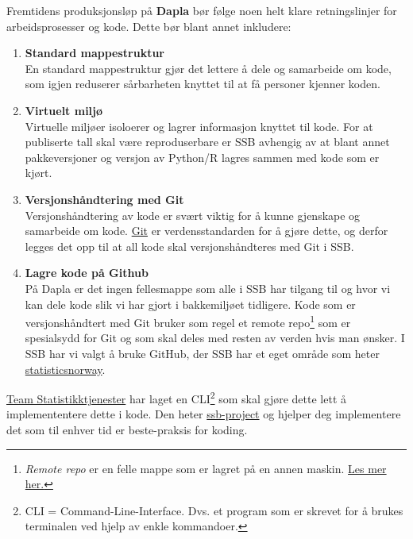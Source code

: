 \documentclass[
  letterpaper,
  DIV=11,
  numbers=noendperiod]{scrreprt}
\providecommand{\tightlist}{%
  \setlength{\itemsep}{0pt}\setlength{\parskip}{0pt}}\usepackage{longtable,booktabs,array}
\begin{document}
Fremtidens produksjonsløp på \textbf{Dapla} bør følge noen helt klare
retningslinjer for arbeidsprosesser og kode. Dette bør blant annet
inkludere:

\begin{enumerate}
\def\labelenumi{\arabic{enumi}.}
\tightlist
\item
  \textbf{Standard mappestruktur}\\
  En standard mappestruktur gjør det lettere å dele og samarbeide om
  kode, som igjen reduserer sårbarheten knyttet til at få personer
  kjenner koden.
\item
  \textbf{Virtuelt miljø}\\
  Virtuelle miljøer isoloerer og lagrer informasjon knyttet til kode.
  For at publiserte tall skal være reproduserbare er SSB avhengig av at
  blant annet pakkeversjoner og versjon av Python/R lagres sammen med
  kode som er kjørt.
\item
  \textbf{Versjonshåndtering med Git}\\
  Versjonshåndtering av kode er svært viktig for å kunne gjenskape og
  samarbeide om kode. \href{https://git-scm.com/}{Git} er
  verdensstandarden for å gjøre dette, og derfor legges det opp til at
  all kode skal versjonshåndteres med Git i SSB.
\item
  \textbf{Lagre kode på Github}\\
  På Dapla er det ingen fellesmappe som alle i SSB har tilgang til og
  hvor vi kan dele kode slik vi har gjort i bakkemiljøet tidligere. Kode
  som er versjonshåndtert med Git bruker som regel et remote
  repo\footnote{\emph{Remote repo} er en felle mappe som er lagret på en
    annen maskin.
    \href{https://git-scm.com/book/en/v2/Git-Basics-Working-with-Remotes}{Les
    mer her.}} som er spesialsydd for Git og som skal deles med resten
  av verden hvis man ønsker. I SSB har vi valgt å bruke GitHub, der SSB
  har et eget område som heter
  \href{https://github.com/statisticsnorway}{statisticsnorway}.
\end{enumerate}

\href{https://statistics-norway.atlassian.net/wiki/spaces/STAT/overview?homepageId=3127312686}{Team
Statistikktjenester} har laget en CLI\footnote{CLI =
  Command-Line-Interface. Dvs. et program som er skrevet for å brukes
  terminalen ved hjelp av enkle kommandoer.} som skal gjøre dette lett å
implemententere dette i kode. Den heter
\href{https://github.com/statisticsnorway/ssb-project-cli}{ssb-project}
og hjelper deg implementere det som til enhver tid er beste-praksis for
koding.
\end{document}
